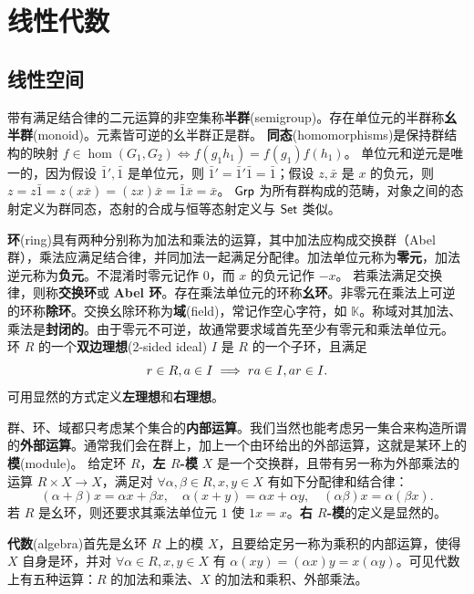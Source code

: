 \chapter{线性代数}\label{appx:LA}

\section{线性空间}

带有满足结合律的二元运算的非空集称\textbf{半群}(semigroup)。存在单位元的半群称\textbf{幺半群}(monoid)。元素皆可逆的幺半群正是群。
\textbf{同态}(homomorphisms)是保持群结构的映射 $f \in \hom(G_1, G_2 ) \Leftrightarrow f (g_1 h_1 )=f (g_1 ) f (h_1 )$。
单位元和逆元是唯一的，因为假设 $\bar 1',\bar 1$ 是单位元，则 $\bar 1'=\bar 1'\bar 1=\bar 1$；假设 $z,\bar x$ 是 $x$ 的负元，则 $z=z\bar 1=z(x\bar x)=(zx)\bar x=\bar 1\bar x=\bar x$。
$\mathsf{Grp}$ 为所有群构成的范畴，对象之间的态射定义为群同态，态射的合成与恒等态射定义与 $\mathsf{Set}$ 类似。

\textbf{环}(ring)具有两种分别称为加法和乘法的运算，其中加法应构成交换群（Abel 群），乘法应满足结合律，并同加法一起满足分配律。加法单位元称为\textbf{零元}，加法逆元称为\textbf{负元}。不混淆时零元记作 $0$，而 $x$ 的负元记作 $-x$。
若乘法满足交换律，则称\textbf{交换环}或 \textbf{Abel 环}。存在乘法单位元的环称\textbf{幺环}。非零元在乘法上可逆的环称\textbf{除环}。交换幺除环称为\textbf{域}(field)，常记作空心字符，如 $\mathbb{K}$。称域对其加法、乘法是\textbf{封闭的}。由于零元不可逆，故通常要求域首先至少有零元和乘法单位元。
环 $R$ 的一个\textbf{双边理想}(2-sided ideal) $I$ 是 $R$ 的一个子环，且满足 
\[r \in R, a \in I \implies r a \in I, a r \in I.\]
可用显然的方式定义\textbf{左理想}和\textbf{右理想}。

群、环、域都只考虑某个集合的\textbf{内部运算}。我们当然也能考虑另一集合来构造所谓的\textbf{外部运算}。通常我们会在群上，加上一个由环给出的外部运算，这就是某环上的\textbf{模}(module)。
给定环 $R$，\textbf{左 $R$-模} $X$ 是一个交换群，且带有另一称为外部乘法的运算 $R \times X \rightarrow X$，满足对 $\forall \alpha,\beta \in R, x,y \in X$ 有如下分配律和结合律：
\[(\alpha+\beta) x=\alpha x+\beta x,\quad \alpha(x+y)=\alpha x+\alpha y,\quad (\alpha\beta)x=\alpha(\beta x).\]
若 $R$ 是幺环，则还要求其乘法单位元 $1$ 使 $1x=x$。\textbf{右 $R$-模}的定义是显然的。

\textbf{代数}(algebra)首先是幺环 $R$ 上的模 $X$，且要给定另一称为乘积的内部运算，使得 $X$ 自身是环，并对 $\forall \alpha \in R, x,y \in X$ 有 $\alpha(xy)=(\alpha x) y=x(\alpha y)$。可见代数上有五种运算：$R$ 的加法和乘法、$X$ 的加法和乘积、外部乘法。


